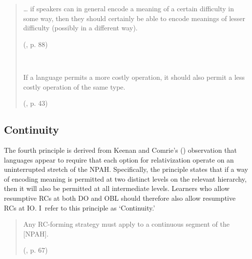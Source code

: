 \begin{quote}
\begin{samepage}
\dots{} if speakers can in general encode a meaning of a certain difficulty in some way, then they should certainly be able to encode meanings of lesser difficulty (possibly in a different way).
\par\nobreak\vspace{5pt}
\hfill (\cite{keenan.comrie1977}, p. 88)
\end{samepage}\\\vspace{12pt}

\begin{samepage}
If a language permits a more costly operation, it should also permit a less costly operation of the same type.\par\nobreak\vspace{5pt}
\hfill (\cite{ogrady2022a}, p. 43)
\end{samepage}
\end{quote}\vspace{-12pt}

\subsection{Continuity}\label{acq-continuity}

The fourth principle is derived from Keenan and Comrie's (\citeyear{keenan.comrie1977}) observation that languages appear to require that each option for relativization operate on an uninterrupted stretch of the NPAH. Specifically, the principle states that if a way of encoding meaning is permitted at two distinct levels on the relevant hierarchy, then it will also be permitted at all intermediate levels. Learners who allow resumptive RCs at both DO and OBL should therefore also allow resumptive RCs at IO. I~refer to this principle as `Continuity.'

\begin{quote}
Any RC-forming strategy must apply to a continuous segment of the [NPAH].
\par\nobreak\vspace{5pt}
\hfill (\cite{keenan.comrie1977}, p. 67)
\end{quote}\vspace{-12pt}


